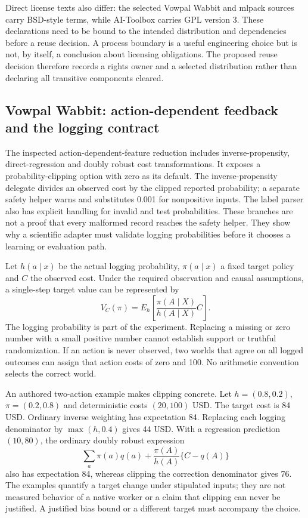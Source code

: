 Direct license texts also differ: the selected Vowpal Wabbit and mlpack sources carry BSD-style terms, while AI-Toolbox carries GPL version 3. These declarations need to be bound to the intended distribution and dependencies before a reuse decision. A process boundary is a useful engineering choice but is not, by itself, a conclusion about licensing obligations. The proposed reuse decision therefore records a rights owner and a selected distribution rather than declaring all transitive components cleared.~\citep{exec24_policycxx_vw,exec24_policycxx_aitoolbox,exec24_policycxx_mlpack,exec24_policycxx_comparison}

\subsection{Vowpal Wabbit: action-dependent feedback and the logging contract}
The inspected action-dependent-feature reduction includes inverse-propensity, direct-regression and doubly robust cost transformations. It exposes a probability-clipping option with zero as its default. The inverse-propensity delegate divides an observed cost by the clipped reported probability; a separate safety helper warns and substitutes 0.001 for nonpositive inputs. The label parser also has explicit handling for invalid and test probabilities. These branches are not a proof that every malformed record reaches the safety helper. They show why a scientific adapter must validate logging probabilities before it chooses a learning or evaluation path.~\citep{exec24_policycxx_vw}

Let $h(a\mid x)$ be the actual logging probability, $\pi(a\mid x)$ a fixed target policy and $C$ the observed cost. Under the required observation and causal assumptions, a single-step target value can be represented by
\[
 V_C(\pi)=E_h\!\left[\frac{\pi(A\mid X)}{h(A\mid X)}C\right].
\]
The logging probability is part of the experiment. Replacing a missing or zero number with a small positive number cannot establish support or truthful randomization. If an action is never observed, two worlds that agree on all logged outcomes can assign that action costs of zero and 100. No arithmetic convention selects the correct world.~\citep{exec24_policycxx_cs2021,exec24_policycxx_anytime2024,exec24_policycxx_comparison}

An authored two-action example makes clipping concrete. Let $h=(0.8,0.2)$, $\pi=(0.2,0.8)$ and deterministic costs $(20,100)$ USD. The target cost is 84 USD. Ordinary inverse weighting has expectation 84. Replacing each logging denominator by $\max(h,0.4)$ gives 44 USD. With a regression prediction $(10,80)$, the ordinary doubly robust expression
\[
 \sum_a\pi(a)q(a)+\frac{\pi(A)}{h(A)}\{C-q(A)\}
\]
also has expectation 84, whereas clipping the correction denominator gives 76. The examples quantify a target change under stipulated inputs; they are not measured behavior of a native worker or a claim that clipping can never be justified. A justified bias bound or a different target must accompany the choice.~\citep{exec24_policycxx_comparison}

